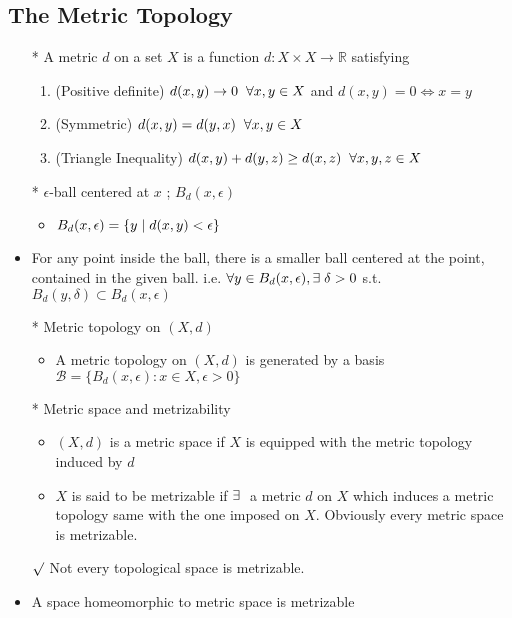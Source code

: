 \documentclass[12pt]{article}
\newcommand{\rmk}{$\surd$}
\newcommand{\sptwo}{\hspace{0.2cm}}
\newcommand{\spone}{\hspace{0.1cm}}
\newcommand{\Real}{\mathbb{R}}
\newcommand{\exist}{\exists\spone}
\begin{document}
\subsection{The Metric Topology}
\smallskip
\begin{itemize}
	\item[*] A metric $d$ on a set $X$ is a function $d : X\times X\rightarrow \Real$ satisfying
	\begin{enumerate}
		\item (Positive definite) $d(x,y)\rightarrow 0 \sptwo \forall x,y \in X$ and $d(x,y)=0 \Leftrightarrow x=y$
		\item (Symmetric) $d(x,y)=d(y,x) \sptwo \forall x,y\in X$
		\item (Triangle Inequality) $d(x,y)+d(y,z)\geq d(x,z) \sptwo \forall x,y,z\in X$ 
	\end{enumerate}
	\item[*] $\epsilon$-ball centered at $x$ ; $B_d(x, \epsilon)$
	\begin{itemize}
		\item $B_d(x, \epsilon)=\{y\spone | \spone d(x,y)<\epsilon \}$
	\end{itemize}
	\item For any point inside the ball, there is a smaller ball centered at the point, contained in the given ball. \sptwo i.e. \sptwo $\forall y\in B_d(x,\epsilon), \exist \delta>0$ s.t. $B_d(y, \delta) \subset B_d(x,\epsilon)$
	\item[*] Metric topology on $(X,d)$
	\begin{itemize}
		\item A metric topology on $(X,d)$ is generated by a basis $\mathcal{B}=\{B_d(x,\epsilon) : x\in X, \epsilon>0\}$
	\end{itemize}
	\item[*] Metric space and metrizability
	\begin{itemize}
		\item $(X,d)$ is a metric space if $X$ is equipped with the metric topology induced by $d$
		\item $X$ is said to be metrizable if $\exist$ a metric $d$ on $X$ which induces a metric topology same with the one imposed on $X$. Obviously every metric space is metrizable.
	\end{itemize}
	\item[\rmk] Not every topological space is metrizable.
	\item A space homeomorphic to metric space is metrizable
	\begin{itemize}

\end{itemize}
\end{itemize}
\end{document}
